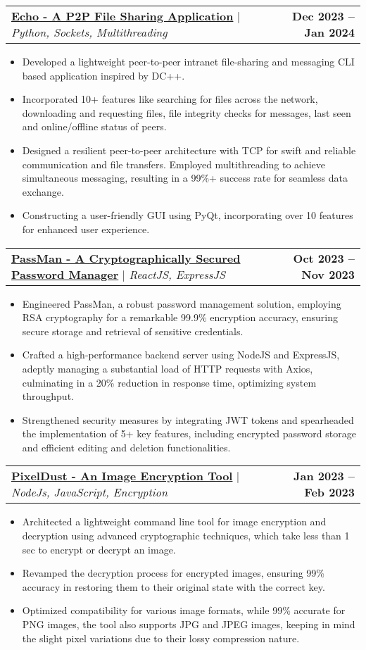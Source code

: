 \documentclass[letterpaper,11pt]{article}
\makeatletter
\newcommand{\resumeItem}[1]{
  \item\small{
    {#1 \vspace{-2pt}}
  }
}
\newcommand{\resumeProjectHeading}[2]{
    \item
    \begin{tabular*}{1.001\textwidth}{l@{\extracolsep{\fill}}r}
      \small#1 & \textbf{\small #2}\\
    \end{tabular*}\vspace{-7pt}
}
\newcommand{\resumeItemListStart}{\begin{itemize}}
\newcommand{\resumeItemListEnd}{\end{itemize}\vspace{-5pt}}
\makeatother
\begin{document}
    \resumeProjectHeading
          {\textbf{\textcolor{OliveGreen}
          {\href{https://github.com/AvijeetJain/Echo.git}
          {Echo - A P2P File Sharing Application}}} $|$ 
          \emph{Python, Sockets, Multithreading}}{Dec 2023 -- Jan 2024}
          \resumeItemListStart
            \resumeItem{Developed a lightweight peer-to-peer intranet file-sharing and messaging CLI based application inspired by DC++.}
            \resumeItem{Incorporated 10+ features like searching for files across the network, downloading and requesting files, file integrity checks for messages, last seen and online/offline status of peers.}
            \resumeItem{Designed a resilient peer-to-peer architecture with TCP for swift and reliable communication and file transfers. Employed multithreading to achieve simultaneous messaging, resulting in a 99\%+ success rate for seamless data exchange.}
            \resumeItem{Constructing a user-friendly GUI using PyQt, incorporating over 10 features for enhanced user experience.}
          \resumeItemListEnd
          \vspace{-13pt}
    
      \resumeProjectHeading
          {\textbf{\textcolor{OliveGreen}
          {\href{https://github.com/AvijeetJain/PassMan}
          {PassMan - A Cryptographically Secured Password Manager}}} $|$ \emph{ReactJS, ExpressJS}}{Oct 2023 -- Nov 2023}
          \resumeItemListStart
            \resumeItem{Engineered PassMan, a robust password management solution, employing RSA cryptography for a remarkable 99.9\% encryption accuracy, ensuring secure storage and retrieval of sensitive credentials.}
            \resumeItem{Crafted a high-performance backend server using NodeJS and ExpressJS, adeptly managing a substantial load of HTTP requests with Axios, culminating in a 20\% reduction in response time, optimizing system throughput.}
            \resumeItem{Strengthened security measures by integrating JWT tokens and spearheaded the implementation of 5+ key features, including encrypted password storage and efficient editing and deletion functionalities.}
          \resumeItemListEnd
          \vspace{-13pt}
          
      \resumeProjectHeading
          {\textbf{\textcolor{OliveGreen}
          {\href{https://github.com/AvijeetJain/pixelDust}
          {PixelDust - An Image Encryption Tool}}} $|$ 
          \emph{NodeJs, JavaScript, Encryption}}{Jan 2023 -- Feb 2023}
          \resumeItemListStart
            \resumeItem{Architected a lightweight command line tool for image encryption and decryption using advanced
            cryptographic techniques, which take less than 1 sec to encrypt or decrypt an image.}
            \resumeItem{Revamped the decryption process for encrypted images, ensuring 99\% accuracy in restoring them to their original state with the correct key.}
            \resumeItem{Optimized compatibility for various image formats, while 99\% accurate for PNG images, the tool also supports JPG and JPEG images, keeping in mind the slight pixel variations due to their lossy compression nature.}            
          \resumeItemListEnd 
          
\end{document}
